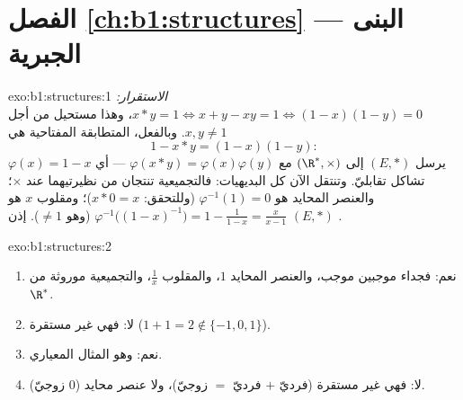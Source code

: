 \section*{الفصل \ref{ch:b1:structures} --- البنى الجبرية}

\begin{solution}{exo:b1:structures:1}
\emph{الاستقرار:} $x * y = 1 \iff x + y - xy = 1 \iff (1-x)(1-y) = 0$،
وهذا مستحيل من أجل $x, y \neq 1$. وبالفعل، المتطابقة المفتاحية هي
\[
1 - x * y = (1 - x)(1 - y):
\]
 $\varphi(x) = 1 - x$ يرسل $(E, *)$ إلى $(\R^*, \times)$ مع
$\varphi(x * y) = \varphi(x)\varphi(y)$ --- أي تشاكل تقابليّ. وتنتقل الآن كل
البديهيات: فالتجميعية  تنتجان من نظيرتيهما
عند $\times$؛ والعنصر المحايد هو $\varphi^{-1}(1) = 0$ (وللتحقق: $x *
0 = x$)؛ ومقلوب $x$ هو $\varphi^{-1}\bigl((1-x)^{-1}\bigr) =
1 - \frac{1}{1-x} = \frac{x}{x - 1}$ (وهو $\neq 1$). إذن $(E, *)$
.
\end{solution}

\begin{solution}{exo:b1:structures:2}
\begin{enumerate}
  \item نعم: فجداء موجبين موجب، والعنصر المحايد $1$، والمقلوب
        $\frac 1x$، والتجميعية موروثة من $\R^*$.
  \item لا: فهي غير مستقرة ($1 + 1 = 2 \notin \{-1,0,1\}$).
  \item نعم: وهو المثال المعياري.
  \item لا: فهي غير مستقرة (فرديّ $+$ فرديّ $=$ زوجيّ)، ولا عنصر محايد ($0$
        زوجيّ).
\end{enumerate}
\end{solution}

